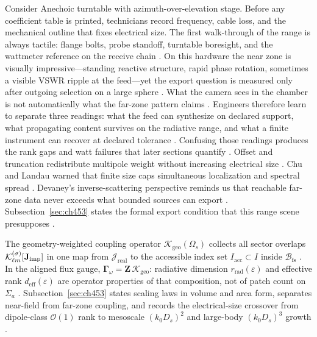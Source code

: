 \begin{physicalvignette}
Consider Anechoic turntable with azimuth-over-elevation stage. Before any coefficient table is printed, technicians record frequency, cable loss, and the mechanical outline that fixes electrical size. The first walk-through of the range is always tactile: flange bolts, probe standoff, turntable boresight, and the wattmeter reference on the receive chain \cite{hansen1988}.
On this hardware the near zone is visually impressive---standing reactive structure, rapid phase rotation, sometimes a visible VSWR ripple at the feed---yet the export question is measured only after outgoing selection on a large sphere \cite{harrington2001}. What the camera sees in the chamber is not automatically what the far-zone pattern claims \cite{stratton1941}.
Engineers therefore learn to separate three readings: what the feed can synthesize on declared support, what propagating content survives on the radiative range, and what a finite instrument can recover at declared tolerance \cite{devaney2004}. Confusing those readings produces the rank gaps and watt failures that later sections quantify \cite{pal2026}.
Offset and truncation redistribute multipole weight without increasing electrical size . 
Chu and Landau warned that finite size caps simultaneous localization and spectral spread \cite{chu1948}. Devaney's inverse-scattering perspective reminds us that reachable far-zone data never exceeds what bounded sources can export \cite{devaney2004}.
Subsection~\ref{sec:ch453} states the formal export condition that this range scene presupposes \cite{stratton1941}.
\end{physicalvignette}
The geometry-weighted coupling operator $\boldsymbol{\mathcal{K}}_{\mathrm{geo}}(\Omega_s)$ collects all sector overlaps $\mathcal{K}_{\ell m}^{(\sigma)}[\mathbf{J}_{\mathrm{imp}}]$ in one map from $\mathcal{J}_{\mathrm{real}}$ to the accessible index set $I_{\mathrm{acc}}\subset I$ inside $\mathcal{B}_{\mathrm{fs}}$ \cite{harrington2001}. In the aligned flux gauge, $\boldsymbol{\Gamma}_\omega=\mathbf{Z}\,\boldsymbol{\mathcal{K}}_{\mathrm{geo}}$: radiative dimension $r_{\mathrm{rad}}(\varepsilon)$ and effective rank $d_{\mathrm{eff}}(\varepsilon)$ are operator properties of that composition, not of patch count on $\Sigma_a$ \cite{hansen1988}. Subsection~\ref{sec:ch453} states scaling laws in volume and area form, separates near-field from far-zone coupling, and records the electrical-size crossover from dipole-class $\mathcal{O}(1)$ rank to mesoscale $(k_0 D_s)^2$ and large-body $(k_0 D_s)^3$ growth \cite{harrington2001}.

